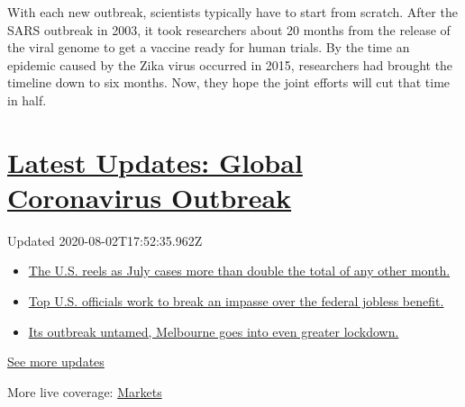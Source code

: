 With each new outbreak, scientists typically have to start from scratch.
After the SARS outbreak in 2003, it took researchers about 20 months
from the release of the viral genome to get a vaccine ready for human
trials. By the time an epidemic caused by the Zika virus occurred in
2015, researchers had brought the timeline down to six months. Now, they
hope the joint efforts will cut that time in half.

\hypertarget{latest-updates-global-coronavirus-outbreak}{%
\section{\texorpdfstring{\href{https://www.nytimes.com/2020/08/01/world/coronavirus-covid-19.html?action=click\&pgtype=Article\&state=default\&region=MAIN_CONTENT_1\&context=storylines_live_updates}{Latest
Updates: Global Coronavirus
Outbreak}}{Latest Updates: Global Coronavirus Outbreak}}\label{latest-updates-global-coronavirus-outbreak}}

Updated 2020-08-02T17:52:35.962Z

\begin{itemize}
\tightlist
\item
  \href{https://www.nytimes.com/2020/08/01/world/coronavirus-covid-19.html?action=click\&pgtype=Article\&state=default\&region=MAIN_CONTENT_1\&context=storylines_live_updates\#link-34047410}{The
  U.S. reels as July cases more than double the total of any other
  month.}
\item
  \href{https://www.nytimes.com/2020/08/01/world/coronavirus-covid-19.html?action=click\&pgtype=Article\&state=default\&region=MAIN_CONTENT_1\&context=storylines_live_updates\#link-780ec966}{Top
  U.S. officials work to break an impasse over the federal jobless
  benefit.}
\item
  \href{https://www.nytimes.com/2020/08/01/world/coronavirus-covid-19.html?action=click\&pgtype=Article\&state=default\&region=MAIN_CONTENT_1\&context=storylines_live_updates\#link-2bc8948}{Its
  outbreak untamed, Melbourne goes into even greater lockdown.}
\end{itemize}

\href{https://www.nytimes.com/2020/08/01/world/coronavirus-covid-19.html?action=click\&pgtype=Article\&state=default\&region=MAIN_CONTENT_1\&context=storylines_live_updates}{See
more updates}

More live coverage:
\href{https://www.nytimes.com/live/2020/07/31/business/stock-market-today-coronavirus?action=click\&pgtype=Article\&state=default\&region=MAIN_CONTENT_1\&context=storylines_live_updates}{Markets}

